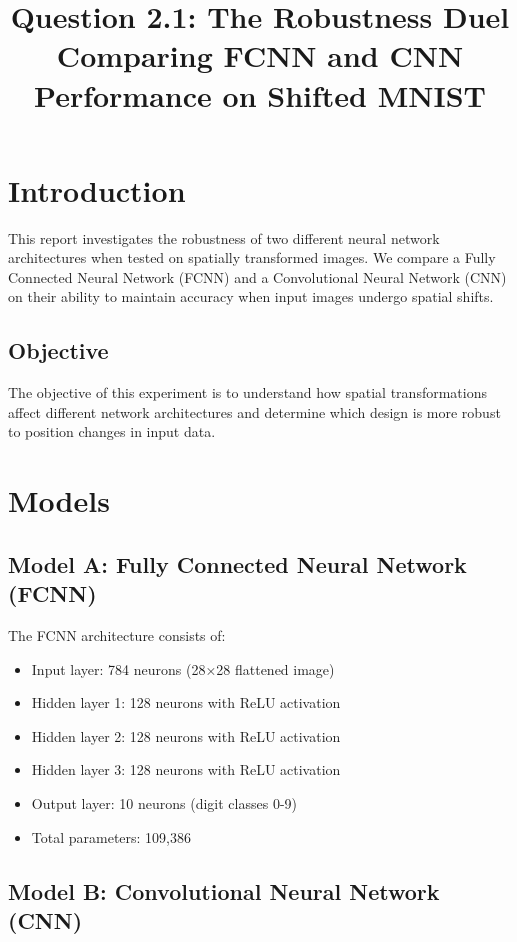 \documentclass[11pt,a4paper]{article}
\title{\textbf{Question 2.1: The Robustness Duel} \\ 
\large Comparing FCNN and CNN Performance on Shifted MNIST}
\begin{document}
\maketitle

\section{Introduction}

This report investigates the robustness of two different neural network architectures when tested on spatially transformed images. We compare a Fully Connected Neural Network (FCNN) and a Convolutional Neural Network (CNN) on their ability to maintain accuracy when input images undergo spatial shifts.

\subsection{Objective}

The objective of this experiment is to understand how spatial transformations affect different network architectures and determine which design is more robust to position changes in input data.

\section{Models}

\subsection{Model A: Fully Connected Neural Network (FCNN)}

The FCNN architecture consists of:
\begin{itemize}
    \item Input layer: 784 neurons (28×28 flattened image)
    \item Hidden layer 1: 128 neurons with ReLU activation
    \item Hidden layer 2: 128 neurons with ReLU activation
    \item Hidden layer 3: 128 neurons with ReLU activation
    \item Output layer: 10 neurons (digit classes 0-9)
    \item Total parameters: 109,386
\end{itemize}

\subsection{Model B: Convolutional Neural Network (CNN)}
\end{document}
